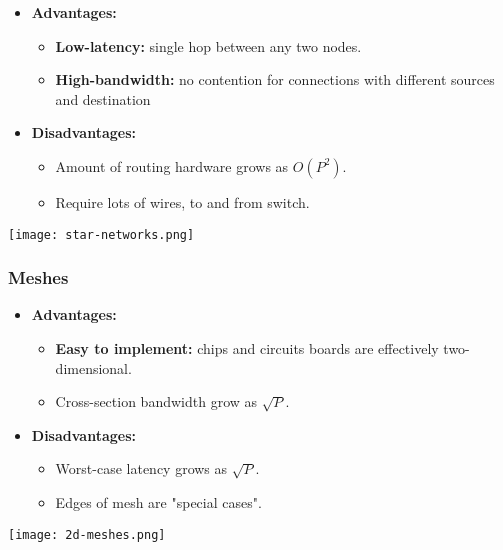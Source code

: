 \documentclass[../main.tex]{subfiles}
\begin{document}
\begin{multicols}{2}
	\begin{itemize}
		\item \textbf{Advantages:}
		      \begin{itemize}
			      \item \textbf{Low-latency:} single hop between any two nodes.
			      \item \textbf{High-bandwidth:} no contention for connections with different sources and destination
		      \end{itemize}
		\item \textbf{Disadvantages:}
		      \begin{itemize}
			      \item Amount of routing hardware grows as \(O(P^2)\).
			      \item Require lots of wires, to and from switch.
		      \end{itemize}
	\end{itemize}

	\begin{center}
		\texttt{[image: star-networks.png]}
	\end{center}
\end{multicols}

\subsubsection{Meshes}

\begin{multicols}{2}
	\begin{itemize}
		\item \textbf{Advantages:}
		      \begin{itemize}
			      \item \textbf{Easy to implement:} chips and circuits boards are effectively two-dimensional.
			      \item Cross-section bandwidth grow as \(\sqrt{P}\).
		      \end{itemize}
		\item \textbf{Disadvantages:}
		      \begin{itemize}
			      \item Worst-case latency grows as \(\sqrt{P}\).
			      \item Edges of mesh are "special cases".
		      \end{itemize}
	\end{itemize}

	\begin{center}
		\texttt{[image: 2d-meshes.png]}
	\end{center}
\end{multicols}
\end{document}
